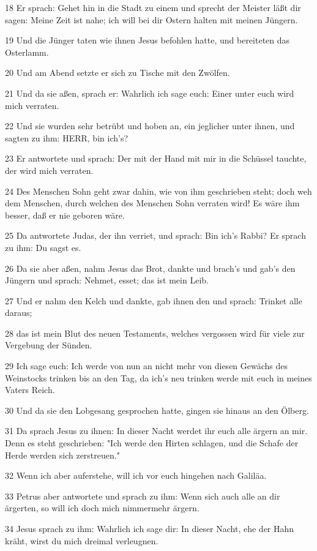 \par 18 Er sprach: Gehet hin in die Stadt zu einem und sprecht der Meister läßt dir sagen: Meine Zeit ist nahe; ich will bei dir Ostern halten mit meinen Jüngern.
\par 19 Und die Jünger taten wie ihnen Jesus befohlen hatte, und bereiteten das Osterlamm.
\par 20 Und am Abend setzte er sich zu Tische mit den Zwölfen.
\par 21 Und da sie aßen, sprach er: Wahrlich ich sage euch: Einer unter euch wird mich verraten.
\par 22 Und sie wurden sehr betrübt und hoben an, ein jeglicher unter ihnen, und sagten zu ihm: HERR, bin ich's?
\par 23 Er antwortete und sprach: Der mit der Hand mit mir in die Schüssel tauchte, der wird mich verraten.
\par 24 Des Menschen Sohn geht zwar dahin, wie von ihm geschrieben steht; doch weh dem Menschen, durch welchen des Menschen Sohn verraten wird! Es wäre ihm besser, daß er nie geboren wäre.
\par 25 Da antwortete Judas, der ihn verriet, und sprach: Bin ich's Rabbi? Er sprach zu ihm: Du sagst es.
\par 26 Da sie aber aßen, nahm Jesus das Brot, dankte und brach's und gab's den Jüngern und sprach: Nehmet, esset; das ist mein Leib.
\par 27 Und er nahm den Kelch und dankte, gab ihnen den und sprach: Trinket alle daraus;
\par 28 das ist mein Blut des neuen Testaments, welches vergossen wird für viele zur Vergebung der Sünden.
\par 29 Ich sage euch: Ich werde von nun an nicht mehr von diesen Gewächs des Weinstocks trinken bis an den Tag, da ich's neu trinken werde mit euch in meines Vaters Reich.
\par 30 Und da sie den Lobgesang gesprochen hatte, gingen sie hinaus an den Ölberg.
\par 31 Da sprach Jesus zu ihnen: In dieser Nacht werdet ihr euch alle ärgern an mir. Denn es steht geschrieben: "Ich werde den Hirten schlagen, und die Schafe der Herde werden sich zerstreuen."
\par 32 Wenn ich aber auferstehe, will ich vor euch hingehen nach Galiläa.
\par 33 Petrus aber antwortete und sprach zu ihm: Wenn sich auch alle an dir ärgerten, so will ich doch mich nimmermehr ärgern.
\par 34 Jesus sprach zu ihm: Wahrlich ich sage dir: In dieser Nacht, ehe der Hahn kräht, wirst du mich dreimal verleugnen.
